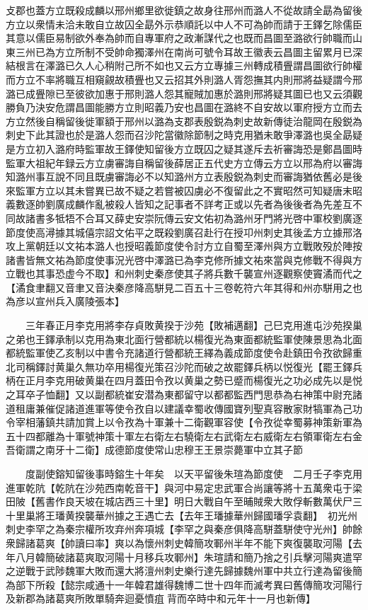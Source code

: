 攴郡也蓋方立既殺成麟以邢州鄉里欲徙鎮之故身往邢州而潞人不從故請全勗為留後方立以衆情未洽未敢自立故囚全勗外示恭順託以中人不可為帥而請于王鐸乞除儒臣其意以儒臣易制欲外奉為帥而自專軍府之政漸謀代之也既而昌圖至潞欲行帥職而山東三州已為方立所制不受帥命獨澤州在南尚可號令耳故王徽表云昌圖主留累月已深結根言在澤潞已久人心稍附己所不如也又云方立專據三州轉成積舋謂昌圖欲行帥權而方立不率將職互相窺覦故積舋也又云招其外則潞人胥怨撫其内則邢將益疑謂今邢潞已成舋隙已至彼欲加惠于邢則潞人怨其寵賊加惠於潞則邢將疑其圖已也又云須觀勝負乃決安危謂昌圖能勝方立則昭義乃安也昌圖在潞終不自安故以軍府授方立而去方立然後自稱留後徙軍額于邢州以潞為支郡表殷鋭為刺史故新傳徒治龍岡在殷鋭為刺史下此其證也於是潞人怨而召沙陀當徽除節制之時克用猶未敢爭澤潞也吳全勗疑是方立初入潞府時監軍故王鐸使知留後方立既囚之疑其遂斥去祈審誨恐是鄭昌圖時監軍大祖紀年録云方立虜審誨自稱留後薛居正五代史方立傳云方立以邢為府以審誨知潞州事互說不同且既虜審誨必不以知潞州方立表殷鋭為刺史而審誨猶依舊必是後來監軍方立以其未嘗異已故不疑之若嘗被囚虜必不復留此之不實昭然可知疑唐末昭義數逐帥劉廣成麟作亂被殺人皆知之記事者不詳考正或以先者為後後者為先差互不同故諸書多牴牾不合耳又薛史安崇阮傳云安文佑初為潞州牙門將光啓中軍校劉廣逐節度使高潯據其城僖宗詔文佑平之既殺劉廣召赴行在授卭州刺史其後孟方立據邢洛攻上黨朝廷以文祐本潞人也授昭義節度使令討方立自蜀至澤州與方立戰敗殁於陣按諸書皆無文祐為節度使事況光啓中澤潞已為李克修所據文祐來當與克修戰不得與方立戰也其事恐虚今不取】和州刺史秦彦使其子將兵數千襲宣州逐觀察使竇潏而代之【潏食聿翻又音聿又音決秦彦降高駢見二百五十三卷乾符六年其得和州亦駢用之也為彦以宣州兵入廣陵張本】

　　三年春正月李克用將李存貞敗黄揆于沙苑【敗補邁翻】己巳克用進屯沙苑揆巢之弟也王鐸承制以克用為東北面行營都統以楊復光為東面都統監軍使陳景思為北面都統監軍使乙亥制以中書令充諸道行營都統王繹為義成節度使令赴鎮田令孜欲歸重北司稱鐸討黄巢久無功卒用楊復光策召沙陀而破之故罷鐸兵柄以悦復光【罷王鐸兵柄在正月李克用破黄巢在四月蓋田令孜以黄巢之勢已蹙而楊復光之功必成先以是悦之耳卒子恤翻】又以副都統崔安潜為東都留守以都都監西門思恭為右神策中尉充諸道租庸兼催促諸道進軍等使令孜自以建議幸蜀收傳國寶列聖真容散家財犒軍為己功令宰相藩鎮共請加賞上以令孜為十軍兼十二衛觀軍容使【令孜從幸蜀募神策新軍為五十四都離為十軍號神策十軍左右衛左右驍衛左右武衛左右威衛左右領軍衛左右金吾衛謂之南牙十二衛】成德節度使常山忠穆王王景崇薨軍中立其子節

　　度副使鎔知留後事時鎔生十年矣　以天平留後朱瑄為節度使　二月壬子李克用進軍乾阬【乾阬在沙苑西南乾音干】與河中易定忠武軍合尚讓等將十五萬衆屯于梁田陂【舊書作良天坡在城店西三十里】明日大戰自午至晡賊衆大敗俘斬數萬伏尸三十里巢將王璠黄揆襲華州據之王遇亡去【去年王璠據華州歸國璠孚袁翻】　初光州刺史李罕之為秦宗權所攻弃州奔項城【李罕之與秦彦俱降高駢蓋駢使守光州】帥餘衆歸諸葛爽【帥讀曰率】爽以為懷州刺史韓簡攻鄆州半年不能下爽復襲取河陽【去年八月韓簡破諸葛爽取河陽十月移兵攻鄆州】朱瑄請和簡乃捨之引兵擊河陽爽遣罕之逆戰于武陟魏軍大敗而還大將澶州刺史樂行達先歸據魏州軍中共立行達為留後簡為部下所殺【懿宗咸通十一年韓君雄得魏博二世十四年而滅考異曰舊傳簡攻河陽行及新郡為諸葛爽所敗單騎奔迴憂憤疽背而卒時中和元年十一月也新傳】

